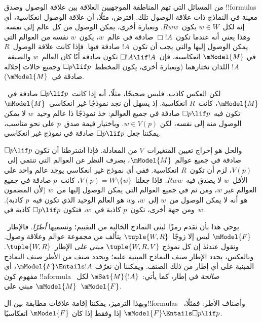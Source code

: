 \documentclass[../../../include/open-logic-section]{subfiles}
\begin{document}


من المسائل التي تهم المناطقة الموجهيين العلاقة بين علاقة الوصول وصدق
!!{formula}s معينة في النماذج ذات علاقة الوصول تلك. افترض، مثلًا، أن
علاقة الوصول انعكاسية، أي إنه لكل~$w \in W$ يكون~$Rww$. وبعبارة أخرى،
يمكن الوصول من كل عالم إلى نفسه. وهذا يعني أنه عندما تكون~$\Box !A$
صادقة في عالم~$w$، يكون~$w$ نفسه من العوالم التي يمكن الوصول إليها
والتي يجب أن تكون~$!A$ صادقة فيها. فإذا كانت علاقة الوصول~$R$ في
$\mModel{M}$ انعكاسية، فإن~$\Box !A \lif !A$ تكون صادقة أيًا كان
العالم~$w$ والصيغة~$!A$ اللذان نختارهما (وبعبارة أخرى، يكون
المخطط~$\Box p \lif p$ وجميع حالات إحلاله صادقة في~$\mModel{M}$).

لكن العكس كاذب. فليس صحيحًا، مثلًا، أنه إذا كانت~$\Box p \lif p$
صادقة في~$\mModel{M}$، كانت~$R$ انعكاسية. إذ يسهل أن نجد نموذجًا غير
انعكاسي~$\mModel{M}$ تكون فيه~$\Box p \lif p$ صادقة في جميع العوالم:
خذ نموذجًا ذا عالم وحيد~$w$ لا يمكن الوصول منه إلى نفسه، لكن
$w \in V(p)$. وباختيار قيمة صدق~$p$ على نحو مناسب، يمكننا جعل
$\Box p \lif p$ صادقة في نموذج غير انعكاسي.

والحل هو إخراج تعيين المتغيرات~$V$ من المعادلة. فإذا اشترطنا أن تكون
$\Box p \lif p$ صادقة في جميع عوالم~$\mModel{M}$، بصرف النظر عن
العوالم التي تنتمي إلى~$V(p)$، لزم أن تكون~$R$ انعكاسية. ففي أي نموذج
غير انعكاسي يوجد عالم واحد على الأقل~$w$ لا يصدق فيه~$Rww$. فإذا
جعلنا~$V(p) = W \setminus \{w\}$، كانت~$p$ صادقة في جميع العوالم غير
$w$، ومن ثم في جميع العوالم التي يمكن الوصول إليها من~$w$ (لأن
المضمون هو أنه لا يمكن الوصول من~$w$ إلى~$w$، و$w$ هو العالم الوحيد
الذي تكون فيه~$p$ كاذبة). ومن جهة أخرى، تكون~$p$ كاذبة في~$w$، فتكون
$\Box p \lif p$ كاذبة في~$w$.

يوحي هذا بأن نقدم رمزًا لبنى النماذج الخالية من التقييم؛ ونسميها
\emph{أطرًا}. فالإطار~$\mModel{F}$ ليس إلا زوجًا~$\tuple{W, R}$ يتألف
من مجموعة عوالم وعلاقة وصول. ونقول عندئذ إن كل نموذج
$\tuple{W, R, V}$ \emph{مبني على} الإطار~$\tuple{W, R}$. وبالعكس،
يحدد الإطار صنف النماذج المبنية عليه؛ ويحدد صنف من الأطر صنف النماذج
المبنية على أي إطار من ذلك الصنف. ويمكننا أن نعرّف
$\mModel{F} \Entails !A$، أي مفهوم كون !!a{formula} \emph{صالحة} في
إطار، كما يأتي:~$\mSat{M}{!A}$ لكل~$\mModel{M}$ مبني على~$\mModel{F}$.

وبهذا الترميز، يمكننا إقامة علاقات مطابقة بين ال!!{formula}s وأصناف
الأطر: فمثلًا،~$\mModel{F} \Entails \Box p \lif p$ إذا وفقط إذا كان
$\mModel{F}$ انعكاسيًا.
\end{document}
